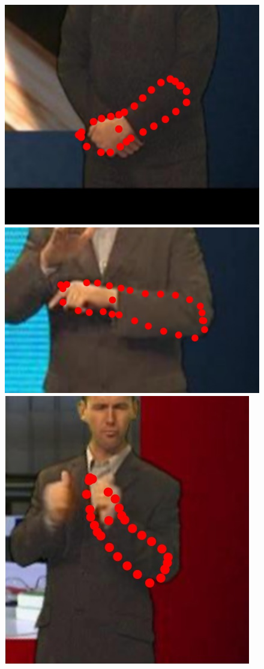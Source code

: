 \begin{figure}
    \includegraphics[height=\ofh]{resources/Annotation_Correction/Suplementory_Meterial/ExFit/0034}
    \hfill
    \includegraphics[height=\ofh]{resources/Annotation_Correction/Suplementory_Meterial/ExFit/0035}
    \hfill
    \includegraphics[height=\ofh]{resources/Annotation_Correction/Suplementory_Meterial/ExFit/0036}

\end{figure}
